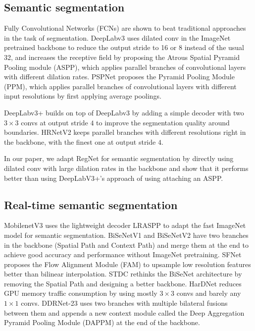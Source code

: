 \documentclass[10pt,twocolumn,letterpaper]{article}
\begin{document}
\subsection{Semantic segmentation}

Fully Convolutional Networks (FCNs)\cite{overfeat,fcn} are shown to beat traditional approaches in the task of segmentation. DeepLabv3\cite{deeplabv3} uses dilated conv in the ImageNet pretrained backbone to reduce the output stride to 16 or 8 instead of the usual 32, and increases the receptive field by proposing the Atrous Spatial Pyramid Pooling module (ASPP), which applies parallel branches of convolutional layers with different dilation rates. PSPNet\cite{pspnet} proposes the Pyramid Pooling Module (PPM), which applies parallel branches of convolutional layers with different input resolutions by first applying average poolings.

DeepLabv3+\cite{deeplabv3plus2018} builds on top of DeepLabv3 by adding a simple decoder with two $3\times 3$ convs at output stride $4$ to improve the segmentation quality around boundaries. HRNetV2\cite{hrnetv2} keeps parallel branches with different resolutions right in the backbone, with the finest one at output stride $4$. 

In our paper, we adapt RegNet for semantic segmentation by directly using dilated conv with large dilation rates in the backbone and show that it performs better than using DeepLabV3+'s approach of using attaching an ASPP.



\subsection{Real-time semantic segmentation}
MobilenetV3 uses the lightweight decoder LRASPP\cite{mobilenetv32019} to adapt the fast ImageNet model for semantic segmentation. BiSeNetV1\cite{bisenetv1} and BiSeNetV2\cite{bisenetv2} have two branches in the backbone (Spatial Path and Context Path) and merge them at the end to achieve good accuracy and performance without ImageNet pretraining. SFNet\cite{sfnet} proposes the Flow Alignment Module (FAM) to upsample low resolution features better than bilinear interpolation. STDC\cite{stdc} rethinks the BiSeNet architecture by removing the Spatial Path and designing a better backbone. HarDNet\cite{hardnet} reduces GPU memory traffic consumption by using mostly $3\times 3$ convs and barely any $1\times 1$ convs. DDRNet-23\cite{ddrnet} uses two branches with multiple bilateral fusions between them and appends a new context module called the Deep Aggregation Pyramid Pooling Module (DAPPM) at the end of the backbone.
\end{document}
